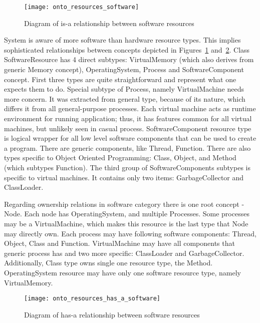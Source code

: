 \begin{figure}[ht]
\centering
\texttt{[image: onto\_resources\_software]}
\caption{Diagram of is-a relationship between software resources}
\label{fig:onto_resources_software}
\end{figure}

System is aware of more software than hardware resource types. This implies sophisticated relationships between concepts depicted in Figures~\ref{fig:onto_resources_software} and~\ref{fig:onto_resources_has_a_software}. Class SoftwareResource has 4 direct subtypes: VirtualMemory (which also derives from generic Memory concept), OperatingSystem, Process and SoftwareComponent concept. First three types are quite straightforward and represent what one expects them to do. Special subtype of Process, namely VirtualMachine needs more concern. It was extracted from general type, because of its nature, which differs it from all general-purpose processes. Each virtual machine acts as runtime environment for running application; thus, it has features common for all virtual machines, but unlikely seen in casual process. SoftwareComponent resource type is logical wrapper for all low level software components that can be used to create a program. There are generic components, like Thread, Function. There are also types specific to Object Oriented Programming: Class, Object, and Method (which subtypes Function). The third group of SoftwareComponents subtypes is specific to virtual machines. It contains only two items: GarbageCollector and ClassLoader.

Regarding ownership relations in software category there is one root concept - Node. Each node has OperatingSystem, and multiple Processes. Some processes may be a VirtualMachine, which makes this resource is the last type that Node may directly own. Each process may have following software components: Thread, Object, Class and Function. VirtualMachine may have all components that generic process has and two more specific: ClassLoader and GarbageCollector. Additionally, Class type owns single one resource type, the Method. OperatingSystem resource may have only one software resource type, namely VirtualMemory.

\begin{figure}[ht]
\centering
\texttt{[image: onto\_resources\_has\_a\_software]}
\caption{Diagram of has-a relationship between software resources}
\label{fig:onto_resources_has_a_software}
\end{figure}

